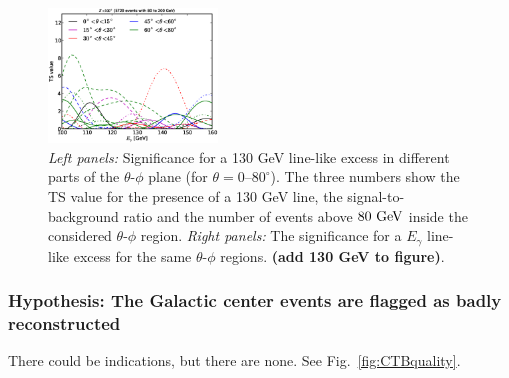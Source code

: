\documentclass[aps,twocolumn,prd,superscriptaddress,showpacs,nofootinbib,fixfloat]{revtex4}
\newcommand{\GeV}{{\rm ~GeV}}
\begin{document}
\begin{figure}[p]
  \includegraphics[width=0.40\textwidth]{plots/scan_z.LE.100.eps}
  \caption{\emph{Left panels:} Significance for a 130 GeV line-like excess in different parts of
  the $\theta$-$\phi$ plane (for $\theta=0$--$80^\circ$). The three numbers
  show the TS value for the presence of a 130 GeV line, the
  signal-to-background ratio and the number of events above $80\GeV$ inside
  the considered $\theta$-$\phi$ region. \emph{Right panels:} The significance
  for a $E_\gamma$ line-like excess for the same $\theta$-$\phi$ regions.
  \textbf{(add 130 GeV to figure)}.}
  \label{fig:polarPlotsAll}
\end{figure}

\subsubsection{Hypothesis: The Galactic center events are flagged as badly
reconstructed}

There could be indications, but there are none. See Fig.~\ref{fig:CTBquality}.
\text
\end{document}
